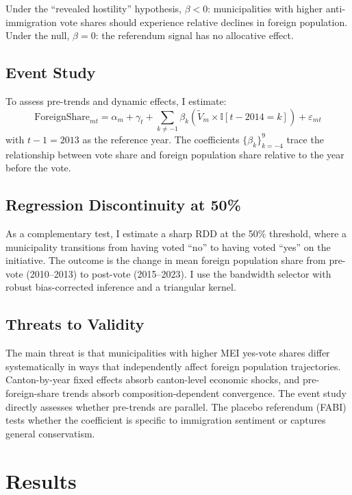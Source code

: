 \documentclass[12pt]{article}
\newcommand{\ind}{\mathbb{I}}
\begin{document}
Under the ``revealed hostility'' hypothesis, $\beta < 0$: municipalities with higher anti-immigration vote shares should experience relative declines in foreign population. Under the null, $\beta = 0$: the referendum signal has no allocative effect.

\subsection{Event Study}

To assess pre-trends and dynamic effects, I estimate:
\begin{equation}
\text{ForeignShare}_{mt} = \alpha_m + \gamma_t + \sum_{k \neq -1} \beta_k \left( \widetilde{V}_m \times \ind[t - 2014 = k] \right) + \varepsilon_{mt}
\end{equation}
with $t - 1 = 2013$ as the reference year. The coefficients $\{\beta_k\}_{k=-4}^{9}$ trace the relationship between vote share and foreign population share relative to the year before the vote.

\subsection{Regression Discontinuity at 50\%}

As a complementary test, I estimate a sharp RDD at the 50\% threshold, where a municipality transitions from having voted ``no'' to having voted ``yes'' on the initiative. The outcome is the change in mean foreign population share from pre-vote (2010--2013) to post-vote (2015--2023). I use the \citet{calonico2014} bandwidth selector with robust bias-corrected inference and a triangular kernel.

\subsection{Threats to Validity}

The main threat is that municipalities with higher MEI yes-vote shares differ systematically in ways that independently affect foreign population trajectories. Canton-by-year fixed effects absorb canton-level economic shocks, and pre-foreign-share trends absorb composition-dependent convergence. The event study directly assesses whether pre-trends are parallel. The placebo referendum (FABI) tests whether the coefficient is specific to immigration sentiment or captures general conservatism.

\section{Results}
\end{document}
